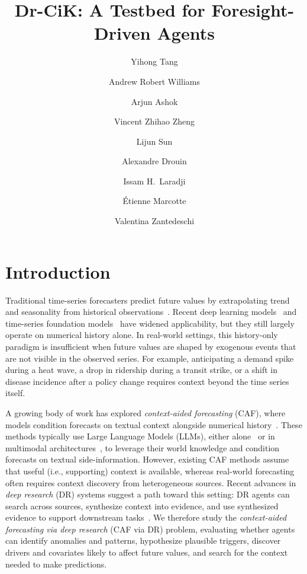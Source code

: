 \documentclass[]{servicenow}
\title{Dr-CiK: A Testbed for Foresight-Driven Agents}
\author[1,2]{Yihong Tang}
\author[2,3,4]{Andrew Robert Williams}
\author[2,3,4]{Arjun Ashok}
\author[1]{Vincent Zhihao Zheng}
\author[1]{Lijun Sun}
\author[2,5,4]{Alexandre Drouin}
\author[2,6]{Issam H.~Laradji}
\author[2]{\'Etienne Marcotte}
\author[2,5]{Valentina Zantedeschi}
\affiliation[1]{McGill University}
\affiliation[2]{ServiceNow Research}
\affiliation[3]{Universit\'e de Montr\'eal}
\affiliation[4]{Mila -- Quebec AI Institute}
\affiliation[5]{Universit\'e Laval}
\affiliation[6]{University of British Columbia}
\begin{document}
\maketitle


\section{Introduction}


Traditional time-series forecasters predict future values by extrapolating trend and seasonality from historical observations~\citep{hyndman2018forecasting,box2015time}.
Recent deep learning models~\citep{lim2021time,chen2023long} and time-series foundation models~\citep{rasul2023lag,garza2023timegpt,ansari2024chronos,woo2024unified} have widened applicability, but they still largely operate on numerical history alone.
In real-world settings, this history-only paradigm is insufficient when future values are shaped by exogenous events that are not visible in the observed series.
For example, anticipating a demand spike during a heat wave, a drop in ridership during a transit strike, or a shift in disease incidence after a policy change requires context beyond the time series itself.




A growing body of work has explored \emph{context-aided forecasting} (CAF), where models condition forecasts on textual context alongside numerical history~\citep{xue2023promptcast,gruver2024large,liu2024time,xu2024beyond,emami2024syscaps,merrill2024language,kim2024multi,wu2025dualforecaster}.
These methods typically use Large Language Models (LLMs), either alone~\citep{requeima2024llm,jin2024timellm,williams2024context} or in multimodal architectures~\citep{liu2024unitime}, to leverage their world knowledge and condition forecasts on textual side-information.
However, existing CAF methods assume that useful (i.e., supporting) context is available, whereas real-world forecasting often requires context discovery from heterogeneous sources.
Recent advances in \emph{deep research} (DR) systems suggest a path toward this setting: DR agents can search across sources, synthesize context into evidence, and use synthesized evidence to support downstream tasks~\citep{abaskohi2025drbench,bosse2025deep,du2025deepresearch}.
We therefore study the \emph{context-aided forecasting via deep research} (CAF via DR) problem, evaluating whether agents can identify anomalies and patterns, hypothesize plausible triggers, discover drivers and covariates likely to affect future values, and search for the context needed to make predictions.
\end{document}
